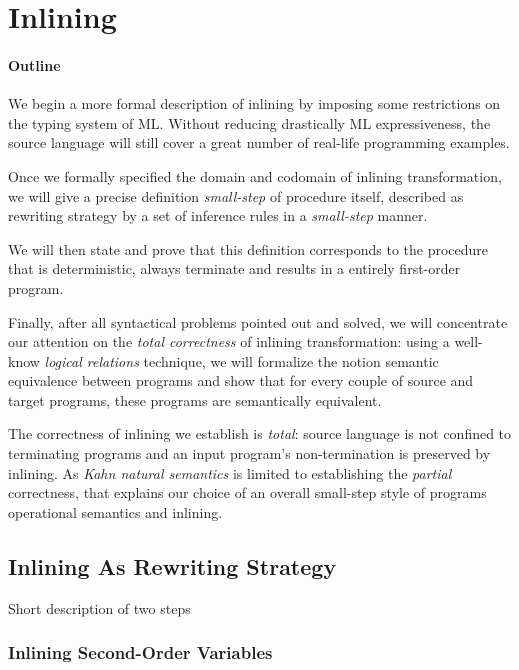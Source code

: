 \documentclass[a4paper,11pt,oneside]{article}
\theoremstyle{plain}
\begin{document}
\newpage
\section{Inlining}

\paragraph*{Outline}
 We begin a more formal description of inlining by imposing some
restrictions on the typing system of ML. Without reducing drastically ML
expressiveness, the source language will still cover a great number of real-life
programming examples.

Once we formally specified the domain and codomain of inlining transformation,
we will give a precise definition \textit{small-step} of procedure itself,
described as rewriting strategy by a set of inference rules in a
\textit{small-step} manner.

We will then state and prove that this definition corresponds to the procedure
that is deterministic, always terminate and results in a entirely first-order
program.

Finally, after all syntactical problems pointed out and solved, we will
concentrate our attention on the \textit{total correctness} of inlining
transformation: using a well-know \textit{logical relations} technique, we will
formalize the notion semantic equivalence between programs and show that for
every couple of source and target programs, these programs are semantically
equivalent.
 
The correctness of inlining we establish is \textit{total}: source language is
not confined to terminating programs and an input program's non-termination is
preserved by inlining. As \textit{Kahn natural semantics} is limited to
establishing the \textit{partial} correctness, that explains our choice of an
overall small-step style of programs operational semantics and inlining.



\subsection{Inlining As Rewriting Strategy}

Short description of two steps 
\subsubsection*{Inlining Second-Order Variables}
\end{document}

